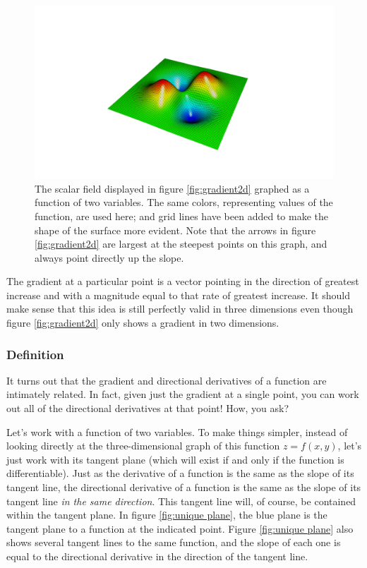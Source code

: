 \documentclass{myarticle}
\theoremstyle{nospace}
\newtheorem{old series theorem}{Theorem}
\newenvironment{series theorem}
{\begin{mdframed}\begin{old series theorem}}
    {\end{old series theorem}\end{mdframed}}
\begin{document}
\begin{figure}[htb!] \centering

  \includegraphics[width=15cm]{data/gradient3d.pdf}

  \caption{The scalar field displayed in figure \ref{fig:gradient2d}
    graphed as a function of two variables. The same colors,
    representing values of the function, are used here; and grid lines
    have been added to make the shape of the surface more evident.
    Note that the arrows in figure \ref{fig:gradient2d} are largest at
    the steepest points on this graph, and always point directly up
    the slope.}
  \label{fig:gradient3d}
\end{figure}

The gradient at a particular point is a vector pointing in the
direction of greatest increase and with a magnitude equal to that rate
of greatest increase. It should make sense that this idea is still
perfectly valid in three dimensions even though figure
\ref{fig:gradient2d} only shows a gradient in two dimensions.

\subsubsection{Definition}
\label{sec:gradient definition}

It turns out that the gradient and directional derivatives of a
function are intimately related. In fact, given just the gradient at a
single point, you can work out all of the directional derivatives at
that point! How, you ask?

Let's work with a function of two variables. To make things simpler,
instead of looking directly at the three-dimensional graph of this
function $z = f(x, y)$, let's just work with its tangent plane (which
will exist if and only if the function is differentiable). Just as the
derivative of a function is the same as the slope of its tangent line,
the directional derivative of a function is the same as the slope of
its tangent line \textit{in the same direction}. This tangent line
will, of course, be contained within the tangent plane. In figure
\ref{fig:unique plane}, the blue plane is the tangent plane to a
function at the indicated point. Figure \ref{fig:unique plane} also
shows several tangent lines to the same function, and the slope of
each one is equal to the directional derivative in the direction of
the tangent line.
\end{document}
